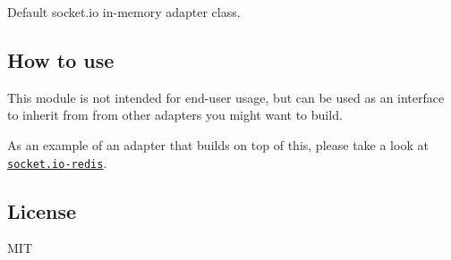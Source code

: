 Default socket.\+io in-\/memory adapter class.

\subsection*{How to use}

This module is not intended for end-\/user usage, but can be used as an interface to inherit from from other adapters you might want to build.

As an example of an adapter that builds on top of this, please take a look at \href{https://github.com/learnboost/socket.io-redis}{\tt socket.\+io-\/redis}.

\subsection*{License}

M\+IT 